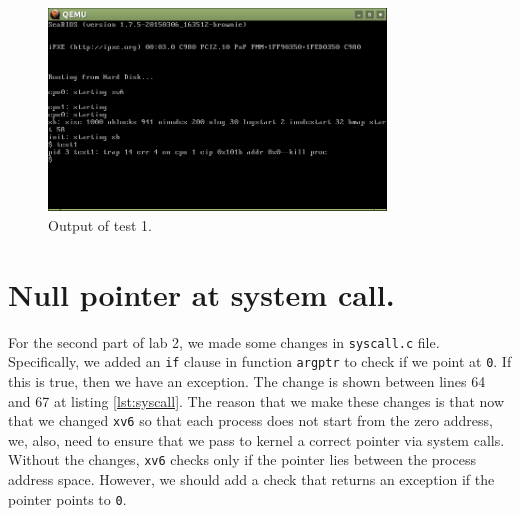 \documentclass[a4paper,10pt]{scrartcl}
\begin{document}



\begin{figure}
  \centering
  \includegraphics[width=0.8\textwidth]{figures/test1.png}
  \caption{Output of test 1.}\label{fig:test1}
\end{figure}

\FloatBarrier

\section{Null pointer at system call.}
For the second part of lab 2, we made some changes in \texttt{syscall.c} file. Specifically, we added an \texttt{if} clause in function \texttt{argptr} to check if we point at \texttt{0}. If this is true, then we have an exception. The change is shown between lines 64 and 67 at listing \ref{lst:syscall}. The reason that we make these changes is that now that we changed \texttt{xv6} so that each process does not start from the zero address, we, also, need to ensure that we pass to kernel a correct pointer via system calls. Without the changes, \texttt{xv6} checks only if the pointer lies between the process address space. However, we should add a check that returns an exception if the pointer points to \texttt{0}.  
\end{document}
